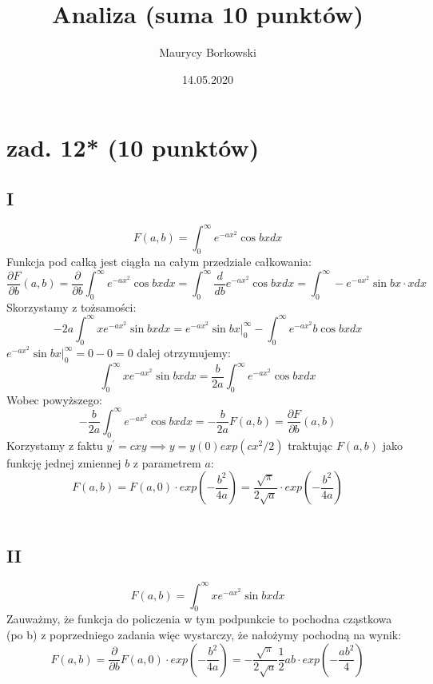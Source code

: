 \documentclass{article}
\title{Analiza (suma 10 punktów)}
\date{14.05.2020}
\author{Maurycy Borkowski}
\begin{document}
\maketitle
\section{zad. 12* (10 punktów)}
\subsection*{I}
$$
F(a,b) = \int_0^\infty e^{-ax^2}\cos {bx} dx
$$
Funkcja pod całką jest ciągła na całym przedziale całkowania:
$$
\frac{\partial F}{\partial b} (a,b) = \frac{\partial }{\partial b} \int_0^\infty e^{-ax^2}\cos {bx} dx = 
\int_0^\infty \frac{d}{d b} e^{-ax^2}\cos {bx} dx = \int_0^\infty -e^{-ax^2}\sin {bx} \cdot x dx
$$
Skorzystamy z tożsamości:
$$
-2a \int_0^\infty x e^{-ax^2}\sin {bx} dx = e^{-ax^2}\sin{bx} {|}_0^\infty - \int_0^\infty e^{-ax^2}b\cos{bx}dx
$$
$e^{-ax^2}\sin{bx} {|}_0^\infty = 0 - 0 = 0$ dalej otrzymujemy:
$$
\int_0^\infty x e^{-ax^2}\sin {bx} dx =  \frac{b}{2a}\int_0^\infty e^{-ax^2}\cos{bx}dx
$$
Wobec powyższego:
$$
-\frac{b}{2a}\int_0^\infty e^{-ax^2}\cos{bx}dx = -\frac{b}{2a}F(a,b) = \frac{\partial F}{\partial b} (a,b)
$$
Korzystamy z faktu $y^\prime = cxy \implies y = y(0)exp(cx^2/2)$ traktując $F(a,b)$ jako funkcję jednej zmiennej $b$ z parametrem $a$:
$$
F(a,b) = F(a,0)\cdot exp(-\frac{b^2}{4a}) = \frac{\sqrt \pi}{2 \sqrt a}\cdot exp(-\frac{b^2}{4a})
$$
\\
\subsection*{II}
$$
F(a,b) = \int_0^\infty xe^{-ax^2}\sin {bx} dx
$$
Zauważmy, że funkcja do policzenia w tym podpunkcie to pochodna cząstkowa (po b) z poprzedniego zadania więc wystarczy, że nałożymy pochodną na wynik:
$$
F(a,b) = \frac{\partial }{\partial b} F(a,0)\cdot exp(-\frac{b^2}{4a}) = -\frac{\sqrt \pi}{2 \sqrt a} \frac{1}{2}ab\cdot exp({-\frac{ab^2}{4}})
$$
\end{document}
